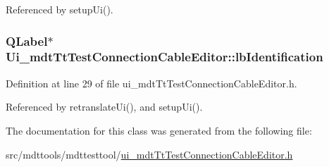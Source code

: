 Referenced by setup\-Ui().

\hypertarget{class_ui__mdt_tt_test_connection_cable_editor_a5ac4572eb43535d5db317a022887a33c}{
\subsubsection[{lb\-Identification}]{\setlength{\rightskip}{0pt plus 5cm}Q\-Label$\ast$ Ui\-\_\-mdt\-Tt\-Test\-Connection\-Cable\-Editor\-::lb\-Identification}}\label{class_ui__mdt_tt_test_connection_cable_editor_a5ac4572eb43535d5db317a022887a33c}


Definition at line 29 of file ui\-\_\-mdt\-Tt\-Test\-Connection\-Cable\-Editor.\-h.



Referenced by retranslate\-Ui(), and setup\-Ui().



The documentation for this class was generated from the following file\-:\begin{DoxyCompactItemize}
\item 
src/mdttools/mdttesttool/\hyperlink{ui__mdt_tt_test_connection_cable_editor_8h}{ui\-\_\-mdt\-Tt\-Test\-Connection\-Cable\-Editor.\-h}\end{DoxyCompactItemize}

